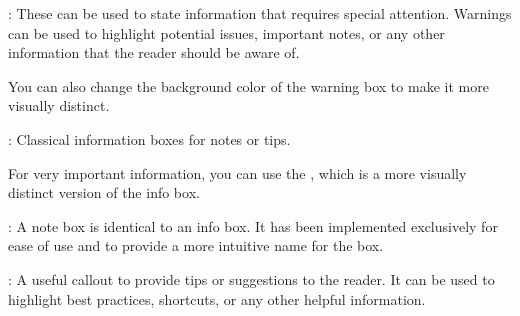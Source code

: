 \documentclass[../main.tex]{subfiles}
\begin{document}
\begin{ebox}[blue]
    \blindtext
\end{ebox}

\oline 

: These can be used to state information that requires special attention. Warnings can be used to highlight potential issues, important notes, or any other information that the reader should be aware of.

\begin{warning}
    \blindtext
\end{warning}

You can also change the background color of the warning box to make it more visually distinct.

\begin{warning}
    \blindtext
\end{warning}

\oline

: Classical information boxes for notes or tips.

\begin{info}
    \blindtext
\end{info}

For very important information, you can use the , which is a more visually distinct version of the info box.

\begin{blueinfo}
    \blindtext
\end{blueinfo}

\oline

: A note box is identical to an info box. It has been implemented exclusively for ease of use and to provide a more intuitive name for the box. 

\begin{note}
    \blindtext
\end{note}

\oline

: A useful callout to provide tips or suggestions to the reader. It can be used to highlight best practices, shortcuts, or any other helpful information.

\begin{tip}
    \blindtext
\end{tip}

\oline
\end{document}
